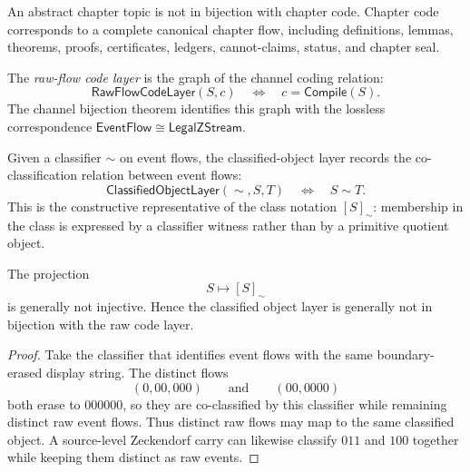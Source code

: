 \begin{corollary}
\label{cor:main-theorems-topic-not-chapter-code}
An abstract chapter topic is not in bijection with chapter code. Chapter code corresponds to a complete canonical chapter flow, including definitions, lemmas, theorems, proofs, certificates, ledgers, cannot-claims, status, and chapter seal.
\end{corollary}

\begin{definition}
\label{def:main-theorems-raw-flow-code-layer}
The \emph{raw-flow code layer} is the graph of the channel coding relation:
$$
  \mathsf{RawFlowCodeLayer}(S,c)
  \quad\Longleftrightarrow\quad
  c=\mathsf{Compile}(S).
$$
The channel bijection theorem identifies this graph with the lossless
correspondence $\mathsf{EventFlow}\cong\mathsf{LegalZStream}$.
\end{definition}

\begin{definition}
\label{def:main-theorems-classified-object-layer}
Given a classifier $\sim$ on event flows, the classified-object layer records the
co-classification relation between event flows:
$$
  \mathsf{ClassifiedObjectLayer}(\sim,S,T)
  \quad\Longleftrightarrow\quad
  S\sim T.
$$
This is the constructive representative of the class notation $[S]_{\sim}$:
membership in the class is expressed by a classifier witness rather than by a
primitive quotient object.
\end{definition}

\begin{theorem}
\label{thm:main-theorems-classifier-quotient-many-to-one}
The projection
$$
  S\longmapsto [S]_{\sim}
$$
is generally not injective. Hence the classified object layer is generally not in bijection with the raw code layer.
\end{theorem}

\begin{proof}
Take the classifier that identifies event flows with the same boundary-erased
display string. The distinct flows
$$
  (0,00,000)
  \qquad\text{and}\qquad
  (00,0000)
$$
both erase to $000000$, so they are co-classified by this classifier while
remaining distinct raw event flows. Thus distinct raw flows may map to the same
classified object. A source-level Zeckendorf carry can likewise classify $011$
and $100$ together while keeping them distinct as raw events.
\end{proof}

